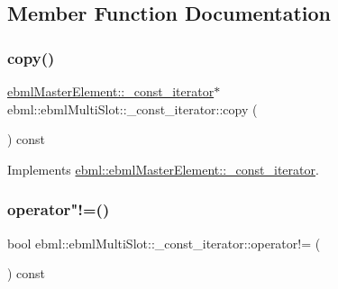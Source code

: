 \subsection{Member Function Documentation}
\mbox{\label{classebml_1_1ebmlMultiSlot_1_1__const__iterator_a412c3cc02df5d62c4a05be31aca752e5}} 
\subsubsection{\texorpdfstring{copy()}{copy()}}
{\footnotesize\ttfamily \mbox{\hyperlink{classebml_1_1ebmlMasterElement_1_1__const__iterator}{ebml\+Master\+Element\+::\+\_\+const\+\_\+iterator}}$\ast$ ebml\+::ebml\+Multi\+Slot\+::\+\_\+const\+\_\+iterator\+::copy (\begin{DoxyParamCaption}{ }\end{DoxyParamCaption}) const\hspace{0.3cm}{\ttfamily [virtual]}}



Implements \mbox{\hyperlink{classebml_1_1ebmlMasterElement_1_1__const__iterator_a64a4853ad363358987eb6492579cd503}{ebml\+::ebml\+Master\+Element\+::\+\_\+const\+\_\+iterator}}.

\mbox{\label{classebml_1_1ebmlMultiSlot_1_1__const__iterator_a9a1c8df8a22d52ecb55de9f151f383e0}} 
\subsubsection{\texorpdfstring{operator"!=()}{operator!=()}}
{\footnotesize\ttfamily bool ebml\+::ebml\+Multi\+Slot\+::\+\_\+const\+\_\+iterator\+::operator!= (\begin{DoxyParamCaption}\item[{const \mbox{\hyperlink{classebml_1_1ebmlMasterElement_1_1__const__iterator}{ebml\+Master\+Element\+::\+\_\+const\+\_\+iterator}} \&}]{ }\end{DoxyParamCaption}) const\hspace{0.3cm}{\ttfamily [virtual]}}



